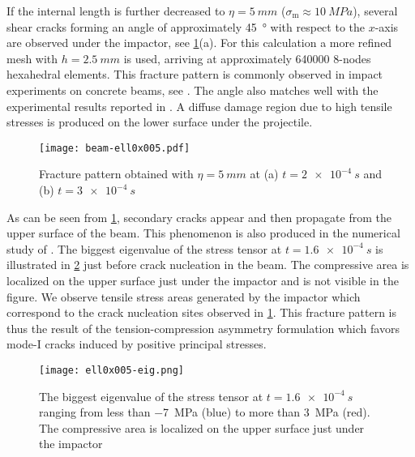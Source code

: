 If the internal length is further decreased to $\eta=\SI{5}{mm}$ ($\sigma_\mathrm{m}\approx \SI{10}{MPa}$), several shear cracks forming an angle of approximately \SI{45}{\degree} with respect to the $x$-axis are observed under the impactor, see \cref{fig:beamsigmell0x005}(a). For this calculation a more refined mesh with $h=\SI{2.5}{mm}$ is used, arriving at approximately \num{640000} 8-nodes hexahedral elements. This fracture pattern is commonly observed in impact experiments on concrete beams, see \cite{OzboltSharma:2011}. The angle also matches well with the experimental results reported in \cite{Guilbaud:2015}. A diffuse damage region due to high tensile stresses is produced on the lower surface under the projectile.
\begin{figure}[htbp]
\centering
\texttt{[image: beam-ell0x005.pdf]}
\caption{Fracture pattern obtained with $\eta=\SI{5}{mm}$ at (a) $t=\SI{2e-4}{s}$ and (b) $t=\SI{3e-4}{s}$} \label{fig:beamsigmell0x005}
\end{figure}

As can be seen from \cref{fig:beamsigmell0x005}, secondary cracks appear and then propagate from the upper surface of the beam. This phenomenon is also produced in the numerical study of \cite{AdhikaryLiFujikake:2012}. The biggest eigenvalue of the stress tensor at $t=\SI{1.6e-4}{s}$ is illustrated in \cref{fig:beameig} just before crack nucleation in the beam. The compressive area is localized on the upper surface just under the impactor and is not visible in the figure. We observe tensile stress areas generated by the impactor which correspond to the crack nucleation sites observed in \cref{fig:beamsigmell0x005}. This fracture pattern is thus the result of the tension-compression asymmetry formulation \cite{FreddiRoyer-Carfagni:2010} which favors mode-I cracks induced by positive principal stresses. 
\begin{figure}[htbp]
\centering
\texttt{[image: ell0x005-eig.png]}
\caption{The biggest eigenvalue of the stress tensor at $t=\SI{1.6e-4}{s}$ ranging from less than \SI{-7}{MPa} (blue) to more than \SI{3}{MPa} (red). The compressive area is localized on the upper surface just under the impactor} \label{fig:beameig}
\end{figure}

